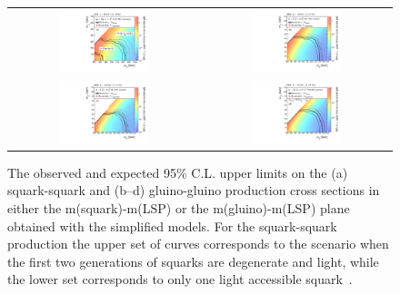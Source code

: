 \begin{figure}[!t]
  \centering
  \begin{tabular}{cc}
                \includegraphics[width=0.49\textwidth]{figures/RA2_Limit1.pdf} &
                \includegraphics[width=0.49\textwidth]{figures/RA2_Limit2.pdf} \\
                \includegraphics[width=0.49\textwidth]{figures/RA2_Limit3.pdf} &
                \includegraphics[width=0.49\textwidth]{figures/RA2_Limit4.pdf} \\
  \end{tabular}
\caption{The observed and expected 95\% C.L. upper limits on the (a) squark-squark and (b--d) gluino-gluino production cross sections in either the m(squark)-m(LSP) or the m(gluino)-m(LSP) plane obtained with the simplified models. For the squark-squark production the upper set of curves corresponds to the scenario when the first two generations of squarks are degenerate and light, while the lower set corresponds to only one light accessible squark~\cite{Chatrchyan:2014lfa}.} 
  \label{fig:ra2_limits}
\end{figure}
